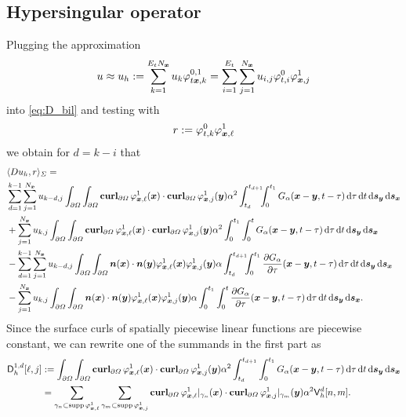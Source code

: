 \documentclass[a4paper,11pt]{article}
\begin{document}
\subsection{Hypersingular operator}

Plugging the approximation
\begin{equation*}
 u \approx u_h := \sum_{k=1}^{E_t N_{{\bm{x}}}} u_k \varphi^{0,1}_{t{{\bm{x}}},k} = \sum_{i=1}^{E_t} \sum_{j=1}^{N_{{\bm{x}}}} u_{i,j} \varphi^0_{t,i} \varphi^1_{{{\bm{x}}},j}
\end{equation*}
into \eqref{eq:D_bil} and testing with
\begin{equation*}
  r := \varphi^0_{t,k} \varphi^1_{{{\bm{x}}},\ell}
\end{equation*}
we obtain for $d=k-i$ that
\begin{align*}
  &\langle Du_h, r \rangle_\Sigma = \\ 
  &\sum_{d=1}^{k-1} \sum_{j=1}^{N_{{\bm{x}}}} u_{k-d,j}\int_{\partial\Omega} \int_{\partial\Omega} \operatorname{\mathbf{curl}}_{\partial\Omega} \varphi^1_{{{\bm{x}}},\ell}({{\bm{x}}}) \cdot \operatorname{\mathbf{curl}}_{\partial\Omega} \varphi^1_{{{\bm{x}}},j}({{\bm{y}}}) \alpha^2 \int_{t_{d}}^{t_{d+1}} \!\!\! \int_{0}^{t_1} G_\alpha({{\bm{x}}}-{{\bm{y}}},t-\tau) \,{\mathrm{d}}\tau \,{\mathrm{d}} t \,{\mathrm{d}}{{\bm{s}}}_{{\bm{y}}} \,{\mathrm{d}}{{\bm{s}}}_{{\bm{x}}} \\
    &+\sum_{j=1}^{N_{{\bm{x}}}} u_{k,j}\int_{\partial\Omega} \int_{\partial\Omega} \operatorname{\mathbf{curl}}_{\partial\Omega} \varphi^1_{{{\bm{x}}},\ell}({{\bm{x}}}) \cdot \operatorname{\mathbf{curl}}_{\partial\Omega} \varphi^1_{{{\bm{x}}},j}({{\bm{y}}}) \alpha^2 \int_{0}^{t_1} \int_{0}^{t} G_\alpha({{\bm{x}}}-{{\bm{y}}},t-\tau) \,{\mathrm{d}}\tau \,{\mathrm{d}} t \,{\mathrm{d}}{{\bm{s}}}_{{\bm{y}}} \,{\mathrm{d}}{{\bm{s}}}_{{\bm{x}}} \\
  &- \sum_{d=1}^{k-1} \sum_{j=1}^{N_{{\bm{x}}}} u_{k-d,j} \int_{\partial\Omega} \int_{\partial\Omega} {{\bm{n}}}({{\bm{x}}}) \cdot {\ensuremath{{\bm{n}}}}({{\bm{y}}}) \varphi^1_{{{\bm{x}}},\ell}({{\bm{x}}}) \varphi^1_{{{\bm{x}}},j}({{\bm{y}}}) \alpha \int_{t_d}^{t_{d+1}} \!\!\! \int_0^{t_1} \frac{\partial G_\alpha}{\partial \tau}({{\bm{x}}}-{{\bm{y}}},t-\tau) \,{\mathrm{d}}\tau \,{\mathrm{d}} t \,{\mathrm{d}}{{\bm{s}}}_{{\bm{y}}} \,{\mathrm{d}}{{\bm{s}}}_{{\bm{x}}} \\
    &- \sum_{j=1}^{N_{{\bm{x}}}} u_{k,j} \int_{\partial\Omega} \int_{\partial\Omega} {{\bm{n}}}({{\bm{x}}}) \cdot {\ensuremath{{\bm{n}}}}({{\bm{y}}}) \varphi^1_{{{\bm{x}}},\ell}({{\bm{x}}}) \varphi^1_{{{\bm{x}}},j}({{\bm{y}}}) \alpha \int_{0}^{t_1} \int_0^{t} \frac{\partial G_\alpha}{\partial \tau}({{\bm{x}}}-{{\bm{y}}},t-\tau) \,{\mathrm{d}}\tau \,{\mathrm{d}} t \,{\mathrm{d}}{{\bm{s}}}_{{\bm{y}}} \,{\mathrm{d}}{{\bm{s}}}_{{\bm{x}}}.
\end{align*}
Since the surface curls of spatially piecewise linear functions are piecewise constant, we can rewrite one of the summands in the first part as
\begin{align*}
  {\ensuremath{{\mathsf{D}}}}^{1,d}_h[\ell,j] &:= \int_{\partial\Omega} \int_{\partial\Omega}\operatorname{\mathbf{curl}}_{\partial\Omega} \varphi^1_{{{\bm{x}}},\ell}({{\bm{x}}}) \cdot \operatorname{\mathbf{curl}}_{\partial\Omega} \varphi^1_{{{\bm{x}}},j}({{\bm{y}}}) \alpha^2 \int_{t_{d}}^{t_{d+1}} \int_{0}^{t_1} G_\alpha({{\bm{x}}}-{{\bm{y}}},t-\tau) \,{\mathrm{d}}\tau \,{\mathrm{d}} t \,{\mathrm{d}}{{\bm{s}}}_{{\bm{y}}} \,{\mathrm{d}}{{\bm{s}}}_{{\bm{x}}} \\
  &= \sum_{\gamma_n \subset \operatorname{supp} \varphi^1_{{{\bm{x}}},\ell}} \sum_{\gamma_m \subset \operatorname{supp} \varphi^1_{{{\bm{x}}},j}} \operatorname{\mathbf{curl}}_{\partial\Omega} \varphi^1_{{{\bm{x}}},\ell}|_{\gamma_n}({{\bm{x}}}) \cdot \operatorname{\mathbf{curl}}_{\partial\Omega} \varphi^1_{{{\bm{x}}},j}|_{\gamma_m}({{\bm{y}}}) \alpha^2 {{\mathsf{V}}}_h^d[n,m].
\end{align*}
\end{document}

